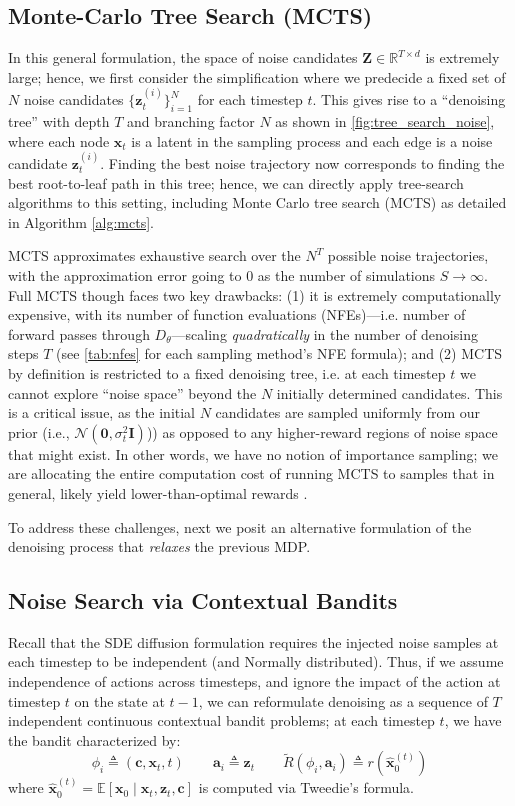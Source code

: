 \documentclass{article}
\newcommand{\x}{\mathbf{x}}
\begin{document}
\subsection{Monte-Carlo Tree Search (MCTS)}
%
In this general formulation, the space of noise candidates $\textbf{Z} \in \mathbb{R}^{T \times d}$ is extremely large; hence, we first consider the simplification where we predecide a fixed set of $N$ noise candidates $\{\mathbf{z}_t^{(i)}\}_{i=1}^N$ for each timestep $t$. This gives rise to a ``denoising tree'' with depth $T$ and branching factor $N$ as shown in \autoref{fig:tree_search_noise}, where each node $\x_t$ is a latent in the sampling process and each edge is a noise candidate $\mathbf{z}_t^{(i)}$. Finding the best noise trajectory now corresponds to finding the best root-to-leaf path in this tree; hence, we can directly apply tree-search algorithms to this setting, including Monte Carlo tree search (MCTS) as detailed in Algorithm \autoref{alg:mcts}.

MCTS approximates exhaustive search over the $N^T$ possible noise trajectories, with the approximation error going to $0$ as the number of simulations $S \to \infty$. Full MCTS though faces two key drawbacks: (1) it is extremely computationally expensive, with its number of function evaluations (NFEs)---i.e. number of forward passes through $D_\theta$---scaling \textit{quadratically} in the number of denoising steps $T$ (see \autoref{tab:nfes} for each sampling method's NFE formula); and (2) MCTS by definition is restricted to a fixed denoising tree, i.e. at each timestep $t$ we cannot explore ``noise space'' beyond the $N$ initially determined candidates. This is a critical issue, as the initial $N$ candidates are sampled uniformly from our prior (i.e., $\mathcal{N}(\mathbf{0},\sigma_t^2\mathbf{I})$)) as opposed to any higher-reward regions of noise space that might exist. In other words, we have no notion of importance sampling; we are allocating the entire computation cost of running MCTS to samples that in general, likely yield lower-than-optimal rewards \citep{chatterjee2017samplesizerequiredimportance}.

To address these challenges, next we posit an alternative formulation of the denoising process that \textit{relaxes} the previous MDP.

\subsection{Noise Search via Contextual Bandits}
%
Recall that the SDE diffusion formulation requires the injected noise samples at each timestep to be independent (and Normally distributed). Thus, if we assume independence of actions across timesteps, and ignore the impact of the action at timestep $t$ on the state at $t-1$, we can reformulate denoising as a sequence of $T$ independent continuous contextual bandit problems; at each timestep $t$, we have the bandit characterized by:
$$\phi_i \triangleq (\mathbf{c},\x_t,t) \qquad {\mathbf{a}}_i \triangleq \mathbf{z}_t\qquad \tilde{R}(\phi_i, {\mathbf{a}}_i) \triangleq r\left(\hat{\mathbf{x}}_0^{(t)}\right)$$
where $\hat{\mathbf{x}}_0^{(t)} = \mathbb{E}[\x_0\mid\x_t,\mathbf{z}_t,\mathbf{c}]$ is computed via Tweedie's formula.
\end{document}

